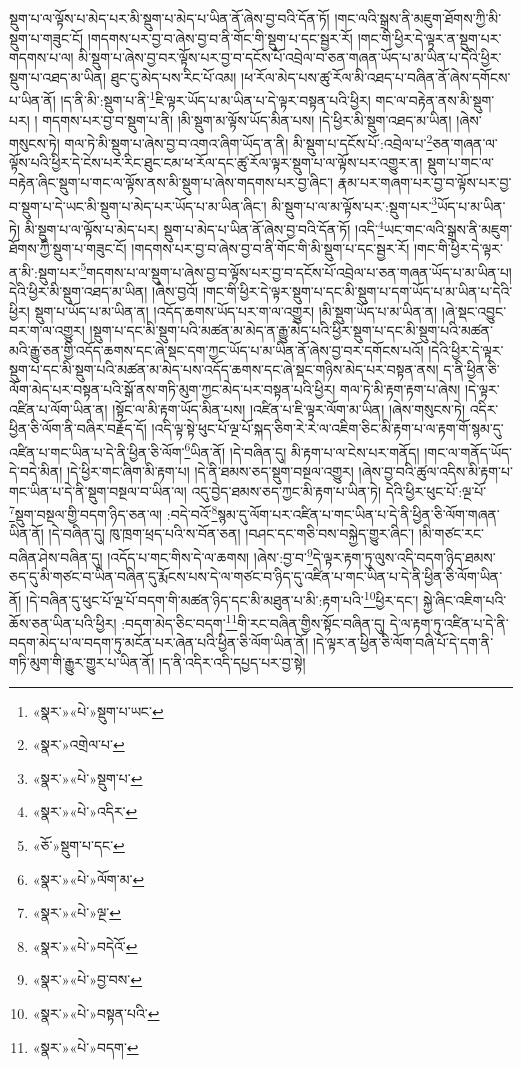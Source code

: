 སྡུག་པ་ལ་ལྟོས་པ་མེད་པར་མི་སྡུག་པ་མེད་པ་ཡིན་ནོ་ཞེས་བྱ་བའི་དོན་ཏོ། །གང་ལའི་སྒྲས་ནི་མཇུག་ཐོགས་ཀྱི་མི་སྡུག་པ་གཟུང་ངོ། །གདགས་པར་བྱ་བ་ཞེས་བྱ་བ་ནི་གོང་གི་སྡུག་པ་དང་སྦྱར་རོ། །གང་གི་ཕྱིར་དེ་ལྟར་ན་སྡུག་པར་གདགས་པ་ལ། མི་སྡུག་པ་ཞེས་བྱ་བར་ལྟོས་པར་བྱ་བ་དངོས་པོ་འབྲེལ་བ་ཅན་གཞན་ཡོད་པ་མ་ཡིན་པ་དེའི་ཕྱིར་སྡུག་པ་འཐད་མ་ཡིན། ཐུང་ངུ་མེད་པས་རིང་པོ་འམ། །ཕ་རོལ་མེད་པས་ཚུ་རོལ་མི་འཐད་པ་བཞིན་ནོ་ཞེས་དགོངས་པ་ཡིན་ནོ། །ད་ནི་མི་:སྡུག་པ་ནི་\footnote{«སྣར་»«པེ་»སྡུག་པ་ཡང་}ཇི་ལྟར་ཡོད་པ་མ་ཡིན་པ་དེ་ལྟར་བསྟན་པའི་ཕྱིར། གང་ལ་བརྟེན་ནས་མི་སྡུག་པར། །
གདགས་པར་བྱ་བ་སྡུག་པ་ནི། །མི་སྡུག་མ་ལྟོས་ཡོད་མིན་པས། །དེ་ཕྱིར་མི་སྡུག་འཐད་མ་ཡིན། །ཞེས་གསུངས་ཏེ། གལ་ཏེ་མི་སྡུག་པ་ཞེས་བྱ་བ་འགའ་ཞིག་ཡོད་ན་ནི། མི་སྡུག་པ་དངོས་པོ་:འབྲེལ་པ་\footnote{«སྣར་»འགྲེལ་པ་}ཅན་གཞན་ལ་ལྟོས་པའི་ཕྱིར་དེ་ངེས་པར་རིང་ཐུང་ངམ་ཕ་རོལ་དང་ཚུ་རོལ་ལྟར་སྡུག་པ་ལ་ལྟོས་པར་འགྱུར་ན། སྡུག་པ་གང་ལ་བརྟེན་ཞིང་སྡུག་པ་གང་ལ་ལྟོས་ནས་མི་སྡུག་པ་ཞེས་གདགས་པར་བྱ་ཞིང་། རྣམ་པར་གཞག་པར་བྱ་བ་ལྟོས་པར་བྱ་བ་སྡུག་པ་དེ་ཡང་མི་སྡུག་པ་མེད་པར་ཡོད་པ་མ་ཡིན་ཞིང་། མི་སྡུག་པ་ལ་མ་ལྟོས་པར་:སྡུག་པར་\footnote{«སྣར་»«པེ་»སྡུག་པ་}ཡོད་པ་མ་ཡིན་ཏེ། མི་སྡུག་པ་ལ་ལྟོས་པ་མེད་པར། སྡུག་པ་མེད་པ་ཡིན་ནོ་ཞེས་བྱ་བའི་དོན་ཏོ། །འདི་\footnote{«སྣར་»«པེ་»འདིར་}ཡང་གང་ལའི་སྒྲས་ནི་མཇུག་ཐོགས་ཀྱི་སྡུག་པ་གཟུང་ངོ། །གདགས་པར་བྱ་བ་ཞེས་བྱ་བ་ནི་གོང་གི་མི་སྡུག་པ་དང་སྦྱར་རོ། །གང་གི་ཕྱིར་དེ་ལྟར་ན་མི་:སྡུག་པར་\footnote{«ཅོ་»སྡུག་པ་དང་}གདགས་པ་ལ་སྡུག་པ་ཞེས་བྱ་བ་ལྟོས་པར་བྱ་བ་དངོས་པོ་འབྲེལ་པ་ཅན་གཞན་ཡོད་པ་མ་ཡིན་པ། དེའི་ཕྱིར་མི་སྡུག་འཐད་མ་ཡིན། །ཞེས་བྱའོ། །གང་གི་ཕྱིར་དེ་ལྟར་སྡུག་པ་དང་མི་སྡུག་པ་དག་ཡོད་པ་མ་ཡིན་པ་དེའི་ཕྱིར། སྡུག་པ་ཡོད་པ་མ་ཡིན་ན། །འདོད་ཆགས་ཡོད་པར་ག་ལ་འགྱུར། །མི་སྡུག་ཡོད་པ་མ་ཡིན་ན། །ཞེ་སྡང་འབྱུང་བར་ག་ལ་འགྱུར། །སྡུག་པ་དང་མི་སྡུག་པའི་མཚན་མ་མེད་ན་རྒྱུ་མེད་པའི་ཕྱིར་སྡུག་པ་དང་མི་སྡུག་པའི་མཚན་མའི་རྒྱུ་ཅན་གྱི་འདོད་ཆགས་དང་ཞེ་སྡང་དག་ཀྱང་ཡོད་པ་མ་ཡིན་ནོ་ཞེས་བྱ་བར་དགོངས་པའོ། །དེའི་ཕྱིར་དེ་ལྟར་སྡུག་པ་དང་མི་སྡུག་པའི་མཚན་མ་མེད་པས་འདོད་ཆགས་དང་ཞེ་སྡང་གཉིས་མེད་པར་བསྟན་ནས། ད་ནི་ཕྱིན་ཅི་ལོག་མེད་པར་བསྟན་པའི་སྒོ་ནས་གཏི་མུག་ཀྱང་མེད་པར་བསྟན་པའི་ཕྱིར། གལ་ཏེ་མི་རྟག་རྟག་པ་ཞེས། །དེ་ལྟར་འཛིན་པ་ལོག་ཡིན་ན། །སྟོང་ལ་མི་རྟག་ཡོད་མིན་པས། །འཛིན་པ་ཇི་ལྟར་ལོག་མ་ཡིན། །ཞེས་གསུངས་ཏེ། འདིར་ཕྱིན་ཅི་ལོག་ནི་བཞིར་བརྗོད་དོ། །འདི་ལྟ་སྟེ་ཕུང་པོ་ལྔ་པོ་སྐད་ཅིག་རེ་རེ་ལ་འཇིག་ཅིང་མི་རྟག་པ་ལ་རྟག་གོ་སྙམ་དུ་འཛིན་པ་གང་ཡིན་པ་དེ་ནི་ཕྱིན་ཅི་ལོག་\footnote{«སྣར་»«པེ་»ལོག་མ་}ཡིན་ནོ། །དེ་བཞིན་དུ། མི་རྟག་པ་ལ་ངེས་པར་གནོད། །གང་ལ་གནོད་ཡོད་དེ་བདེ་མིན། །དེ་ཕྱིར་གང་ཞིག་མི་རྟག་པ། །དེ་ནི་ཐམས་ཅད་སྡུག་བསྔལ་འགྱུར། །ཞེས་བྱ་བའི་ཚུལ་འདིས་མི་རྟག་པ་གང་ཡིན་པ་དེ་ནི་སྡུག་བསྔལ་བ་ཡིན་ལ། འདུ་བྱེད་ཐམས་ཅད་ཀྱང་མི་རྟག་པ་ཡིན་ཏེ། དེའི་ཕྱིར་ཕུང་པོ་:ལྔ་པོ་\footnote{«སྣར་»«པེ་»ལྔ་}སྡུག་བསྔལ་གྱི་བདག་ཉིད་ཅན་ལ། :བདེ་བའོ་\footnote{«སྣར་»«པེ་»བདེའོ་}སྙམ་དུ་ལོག་པར་འཛིན་པ་གང་ཡིན་པ་དེ་ནི་ཕྱིན་ཅི་ལོག་གཞན་ཡིན་ནོ། །དེ་བཞིན་དུ། ཁུ་ཁྲག་ཕྲད་པའི་ས་བོན་ཅན། །བཤང་དང་གཅི་བས་བསྐྱེད་གྱུར་ཞིང་། །མི་གཙང་རང་བཞིན་ཤེས་བཞིན་དུ། །འདོད་པ་གང་གིས་དེ་ལ་ཆགས། །ཞེས་:བྱ་བ་\footnote{«སྣར་»«པེ་»བྱ་བས་}དེ་ལྟར་རྟག་ཏུ་ལུས་འདི་བདག་ཉིད་ཐམས་ཅད་དུ་མི་གཙང་བ་ཡིན་བཞིན་དུ་རྨོངས་པས་དེ་ལ་གཙང་བ་ཉིད་དུ་འཛིན་པ་གང་ཡིན་པ་དེ་ནི་ཕྱིན་ཅི་ལོག་ཡིན་ནོ། །དེ་བཞིན་དུ་ཕུང་པོ་ལྔ་པོ་བདག་གི་མཚན་ཉིད་དང་མི་མཐུན་པ་མི་:རྟག་པའི་\footnote{«སྣར་»«པེ་»བསྟན་པའི་}ཕྱིར་དང་། སྐྱེ་ཞིང་འཇིག་པའི་ཆོས་ཅན་ཡིན་པའི་ཕྱིར། :བདག་མེད་ཅིང་བདག་\footnote{«སྣར་»«པེ་»བདག་}གི་རང་བཞིན་གྱིས་སྟོང་བཞིན་དུ། དེ་ལ་རྟག་ཏུ་འཛིན་པ་དེ་ནི་བདག་མེད་པ་ལ་བདག་ཏུ་མངོན་པར་ཞེན་པའི་ཕྱིན་ཅི་ལོག་ཡིན་ནོ། །དེ་ལྟར་ན་ཕྱིན་ཅི་ལོག་བཞི་པོ་དེ་དག་ནི་གཏི་མུག་གི་རྒྱུར་གྱུར་པ་ཡིན་ནོ། །ད་ནི་འདིར་འདི་དཔྱད་པར་བྱ་སྟེ། 